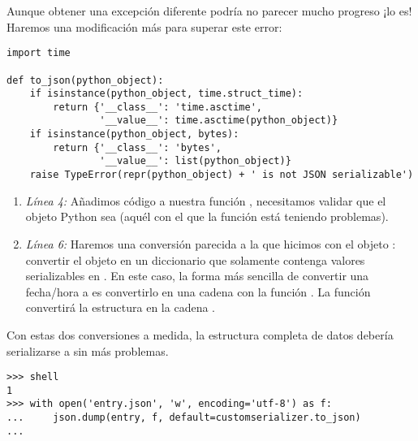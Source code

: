 Aunque obtener una excepción diferente podría no parecer mucho progreso ¡lo es! Haremos una modificación más para superar este error:

\noindent\begin{minipage}{\textwidth}
\begin{lstlisting}[mathescape=True]
import time

def to_json(python_object):
    if isinstance(python_object, time.struct_time):
        return {'__class__': 'time.asctime',
                '__value__': time.asctime(python_object)}
    if isinstance(python_object, bytes):
        return {'__class__': 'bytes',
                '__value__': list(python_object)}
    raise TypeError(repr(python_object) + ' is not JSON serializable')
\end{lstlisting}
\end{minipage}

\begin{enumerate}

\item \emph{Línea 4:} Añadimos código a nuestra función , necesitamos validar que el objeto Python sea  (aquél con el que la función  está teniendo problemas).

\item \emph{Línea 6:} Haremos una conversión parecida a la que hicimos con el objeto : convertir el objeto  en un diccionario que solamente contenga valores serializables en . En este caso, la forma más sencilla de convertir una fecha/hora a  es convertirlo en una cadena con la función . La función  convertirá la estructura en la cadena .

\end{enumerate}

Con estas dos conversiones a medida, la estructura completa de datos  debería serializarse a  sin más problemas.

\noindent\begin{minipage}{\textwidth}
\begin{lstlisting}[mathescape=True]
>>> shell
1
>>> with open('entry.json', 'w', encoding='utf-8') as f:
...     json.dump(entry, f, default=customserializer.to_json)
... 
\end{lstlisting}
\end{minipage}

